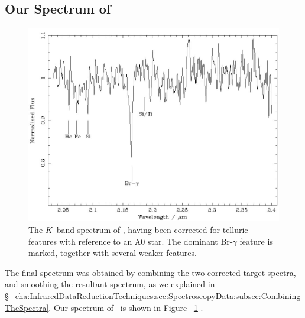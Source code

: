 
\subsection{Our Spectrum of \groj}\label{cha:AccretionDiskContamination:sec:Spectroscopy:subsec:CombiningTheSpectra}

\begin{figure}[!htb]
\begin{center}
\includegraphics[width=5.0in]{j1655editedMasked}
\caption{%
The $K$--band spectrum of \groj, having been corrected for telluric
features with reference to an A0 star. The dominant Br-$\gamma$
feature is marked, together with several weaker features. }\label{cha:AccretionDiskContamination:sec:Spectroscopy:subsec:CombiningTheSpectra:fig:j1655editedMasked}
\end{center}
\end{figure}

The final spectrum was obtained by combining the two corrected target spectra, and smoothing the resultant spectrum, as we explained in \S~\ref{cha:InfraredDataReductionTechniques:sec:SpectroscopyData:subsec:CombiningTheSpectra}. Our spectrum of \groj\ is shown in Figure~%
\ref{cha:AccretionDiskContamination:sec:Spectroscopy:subsec:CombiningTheSpectra:fig:j1655editedMasked}%
. %


